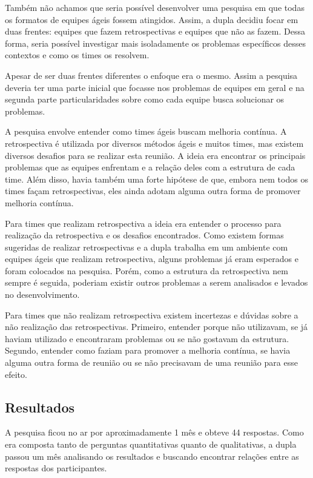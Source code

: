 Também não achamos que seria possível desenvolver uma pesquisa em que todas os formatos de equipes ágeis fossem atingidos. Assim, a dupla decidiu focar em duas frentes: equipes que fazem retrospectivas e equipes que não as fazem. Dessa forma, seria possível investigar mais isoladamente os problemas específicos desses contextos e como os times os resolvem.

Apesar de ser duas frentes diferentes o enfoque era o mesmo. Assim a pesquisa deveria ter uma parte inicial que focasse nos problemas de equipes em geral e na segunda parte particularidades sobre como cada equipe busca solucionar os problemas.

A pesquisa envolve entender como times ágeis buscam melhoria contínua. A retrospectiva é utilizada por diversos métodos ágeis e muitos times, mas existem diversos desafios para se realizar esta reunião. A ideia era encontrar os principais problemas que as equipes enfrentam e a relação deles com a estrutura de cada time. Além disso, havia também uma forte hipótese de que, embora nem todos os times façam retrospectivas, eles ainda adotam alguma outra forma de promover melhoria contínua. 

Para times que realizam retrospectiva a ideia era entender o processo para realização da retrospectiva e os desafios encontrados.  Como existem formas sugeridas de realizar retrospectivas e a dupla trabalha em um ambiente com equipes ágeis que realizam retrospectiva, alguns problemas já eram esperados e foram colocados na pesquisa. Porém, como a estrutura da retrospectiva nem sempre é seguida, poderiam existir outros problemas a serem analisados e levados no desenvolvimento.

Para times que não realizam retrospectiva existem incertezas e dúvidas sobre a não realização das retrospectivas. Primeiro, entender porque não utilizavam, se já haviam utilizado e encontraram problemas ou se não gostavam da estrutura. Segundo, entender como faziam para promover a melhoria contínua, se havia alguma outra forma de reunião ou se não precisavam de uma reunião para esse efeito.

\subsection{Resultados}

A pesquisa ficou no ar por aproximadamente 1 mês e obteve 44 respostas. Como era composta tanto de perguntas quantitativas quanto de qualitativas, a dupla passou um mês analisando os resultados e buscando encontrar relações entre as respostas dos participantes.

